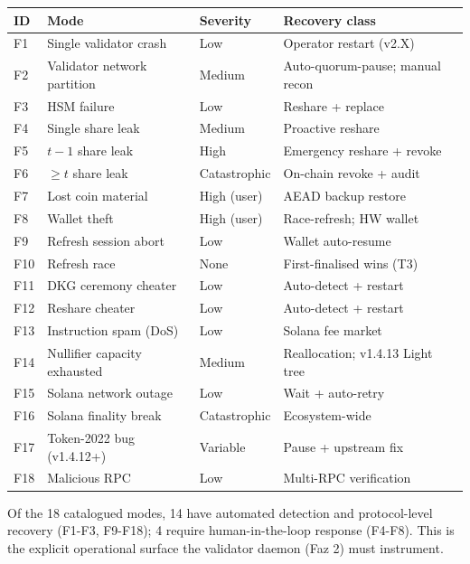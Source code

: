 \begin{center}
\small
\begin{tabular}{@{}llll@{}}
\toprule
ID & Mode & Severity & Recovery class \\
\midrule
F1  & Single validator crash       & Low      & Operator restart (v2.X)         \\
F2  & Validator network partition  & Medium   & Auto-quorum-pause; manual recon \\
F3  & HSM failure                  & Low      & Reshare + replace               \\
F4  & Single share leak            & Medium   & Proactive reshare               \\
F5  & $t-1$ share leak             & High     & Emergency reshare + revoke      \\
F6  & $\geq t$ share leak          & Catastrophic & On-chain revoke + audit     \\
F7  & Lost coin material           & High (user) & AEAD backup restore          \\
F8  & Wallet theft                 & High (user) & Race-refresh; HW wallet      \\
F9  & Refresh session abort        & Low      & Wallet auto-resume              \\
F10 & Refresh race                 & None     & First-finalised wins (T3)       \\
F11 & DKG ceremony cheater         & Low      & Auto-detect + restart           \\
F12 & Reshare cheater              & Low      & Auto-detect + restart           \\
F13 & Instruction spam (DoS)       & Low      & Solana fee market               \\
F14 & Nullifier capacity exhausted & Medium   & Reallocation; v1.4.13 Light tree \\
F15 & Solana network outage        & Low      & Wait + auto-retry               \\
F16 & Solana finality break        & Catastrophic & Ecosystem-wide              \\
F17 & Token-2022 bug (v1.4.12+)    & Variable & Pause + upstream fix            \\
F18 & Malicious RPC                & Low      & Multi-RPC verification          \\
\bottomrule
\end{tabular}
\end{center}

Of the 18 catalogued modes, 14 have automated detection and protocol-level
recovery (F1-F3, F9-F18); 4 require human-in-the-loop response (F4-F8).
This is the explicit operational surface the validator daemon (Faz 2)
must instrument.

